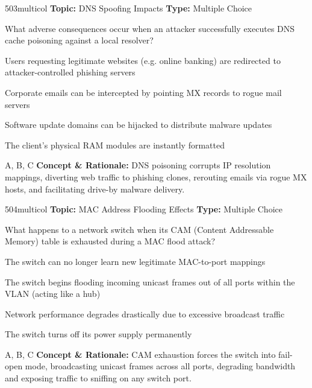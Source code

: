 \begin{qcard}{503}{multicol}
\textcolor{darkslate!75}{\small\textbf{Topic:} DNS Spoofing Impacts \hfill \textbf{Type:} Multiple Choice}\vspace{0.4em}\par
What adverse consequences occur when an attacker successfully executes DNS cache poisoning against a local resolver?
\begin{qoptions}
\item Users requesting legitimate websites (e.g. online banking) are redirected to attacker-controlled phishing servers
\item Corporate emails can be intercepted by pointing MX records to rogue mail servers
\item Software update domains can be hijacked to distribute malware updates
\item The client's physical RAM modules are instantly formatted
\end{qoptions}
\end{qcard}
\nopagebreak
\begin{explainbox}{A, B, C}
\textbf{Concept \& Rationale:} DNS poisoning corrupts IP resolution mappings, diverting web traffic to phishing clones, rerouting emails via rogue MX hosts, and facilitating drive-by malware delivery.
\end{explainbox}

\begin{qcard}{504}{multicol}
\textcolor{darkslate!75}{\small\textbf{Topic:} MAC Address Flooding Effects \hfill \textbf{Type:} Multiple Choice}\vspace{0.4em}\par
What happens to a network switch when its CAM (Content Addressable Memory) table is exhausted during a MAC flood attack?
\begin{qoptions}
\item The switch can no longer learn new legitimate MAC-to-port mappings
\item The switch begins flooding incoming unicast frames out of all ports within the VLAN (acting like a hub)
\item Network performance degrades drastically due to excessive broadcast traffic
\item The switch turns off its power supply permanently
\end{qoptions}
\end{qcard}
\nopagebreak
\begin{explainbox}{A, B, C}
\textbf{Concept \& Rationale:} CAM exhaustion forces the switch into fail-open mode, broadcasting unicast frames across all ports, degrading bandwidth and exposing traffic to sniffing on any switch port.
\end{explainbox}

